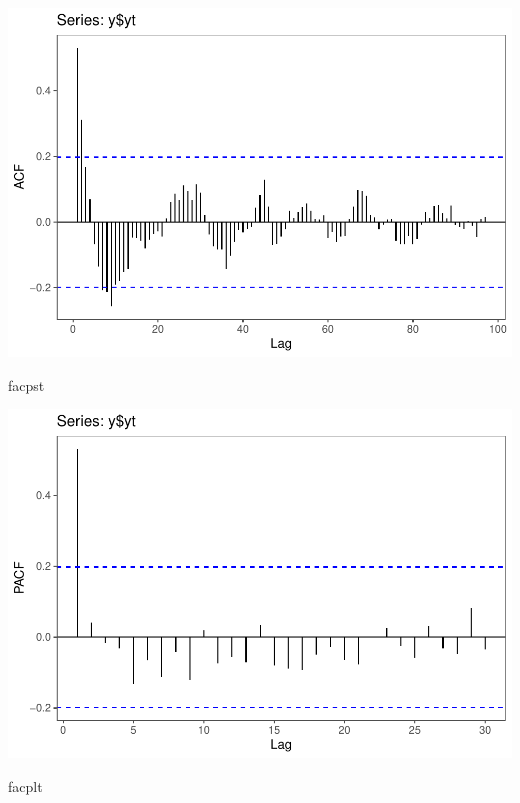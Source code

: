 \documentclass[11pt, a4paper]{report}
\newenvironment{Shaded}{\begin{snugshade}}{\end{snugshade}}
\newcommand{\NormalTok}[1]{#1}
\theoremstyle{plain}
\theoremstyle{plain}
\theoremstyle{remark}
\begin{document}
\begin{center}\includegraphics{Econo2_P5_files/figure-latex/plots fac facp-2} \end{center}

\begin{Shaded}
	\begin{Highlighting}[]
		\NormalTok{facpst}
	\end{Highlighting}
\end{Shaded}

\begin{center}\includegraphics{Econo2_P5_files/figure-latex/plots fac facp-3} \end{center}

\begin{Shaded}
	\begin{Highlighting}[]
		\NormalTok{facplt}
	\end{Highlighting}
\end{Shaded}
\end{document}
